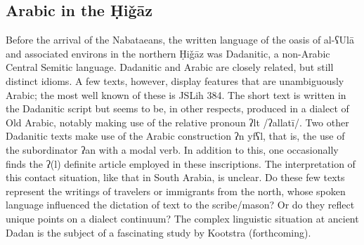 \documentclass[output=paper]{langsci/langscibook}
\begin{document}
\subsection{Arabic in the Ḥiǧāz}
Before the arrival of the Nabataeans, the written language of the oasis of al-ʕUlā and associated environs in the northern Ḥiǧāz was Dadanitic, a non-Arabic Central Semitic language. Dadanitic and Arabic are closely related, but still distinct idioms. A few texts, however, display features that are unambiguously Arabic; the most well known of these is JSLih 384. The short text is written in the Dadanitic script but seems to be, in other respects, produced in a dialect of Old Arabic, notably making use of the relative pronoun ʔlt /ʔallatī/. Two other Dadanitic texts make use of the Arabic construction ʔn yfʕl, that is, the use of the subordinator ʔan with a modal verb. In addition to this, one occasionally finds the ʔ(l) definite article employed in these inscriptions. The interpretation of this contact situation, like that in South Arabia, is unclear. Do these few texts represent the writings of travelers or immigrants from the north, whose spoken language influenced the dictation of text to the scribe/mason? Or do they reflect unique points on a dialect continuum? The complex linguistic situation at ancient Dadan is the subject of a fascinating study by Kootstra (forthcoming).
\end{document}

